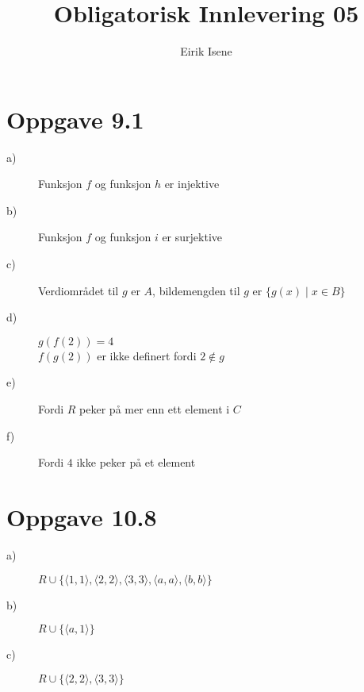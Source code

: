\documentclass[norsk, 12p]{article}
\title{Obligatorisk Innlevering 05}
\author{Eirik Isene}
\begin{document}
\maketitle

\section{Oppgave 9.1}
\begin{description}
\item[a)] Funksjon $f$ og funksjon $h$ er injektive
\item[b)] Funksjon $f$ og funksjon $i$ er surjektive
\item[c)] Verdiområdet til $g$ er $A$, bildemengden til $g$ er $\{g(x) \mid x \in  B\}$
\item[d)] \hspace{3 mm} $g(f(2)) = 4$ \\ $f(g(2))$ er ikke definert fordi $2\notin g$
\item[e)] Fordi $R$ peker på mer enn ett element i $C$
\item[f)] Fordi $4$ ikke peker på et element
\end{description}

\section{Oppgave 10.8}
\begin{description}
\item[a)] $R \cup \{\langle 1,1\rangle,\langle 2,2\rangle,\langle 3,3\rangle,\langle a,a\rangle,\langle b,b\rangle\}$
\item[b)] $R \cup \{\langle a,1\rangle\}$
\item[c)] $R \cup \{\langle 2,2\rangle,\langle 3,3\rangle\}$
\end{description}
\end{document}
